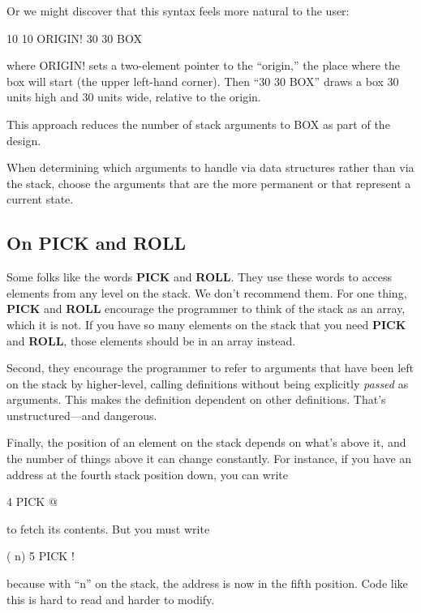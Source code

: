 Or we might discover that this syntax feels more natural to the
user:

\begin{Code}
10 10 ORIGIN! 30 30 BOX
\end{Code}
where ORIGIN! sets a two-element pointer to the ``origin,'' the place
where the box will start (the upper left-hand corner). Then ``30 30 BOX''
draws a box 30 units high and 30 units wide, relative to the origin.

This approach reduces the number of stack arguments to BOX as
part of the design.

\begin{tip}
When determining which arguments to handle via data structures rather
than via the stack, choose the arguments that are the more permanent or
that represent a current state.
\end{tip}
\subsection{On PICK and ROLL}

Some folks like the words \textbf{PICK} and \textbf{ROLL}. They use these words to
access elements from any level on the stack. We don't recommend them.
For one thing, \textbf{PICK} and \textbf{ROLL} encourage the programmer to think
of the stack as an array, which it is not. If you have so many elements on
the stack that you need \textbf{PICK} and \textbf{ROLL}, those elements should be in
an array instead.

Second, they encourage the programmer to refer to arguments that
have been left on the stack by higher-level, calling definitions without
being explicitly \emph{passed} as arguments. This makes the definition
dependent on other definitions. That's unstructured---and dangerous.

Finally, the position of an element on the stack depends on what's
above it, and the number of things above it can change constantly. For
instance, if you have an address at the fourth stack position down, you can
write

\begin{Code}
4 PICK @
\end{Code}
to fetch its contents. But you must write

\begin{Code}
( n) 5 PICK !
\end{Code}
because with ``n'' on the stack, the address is now in the fifth position.
Code like this is hard to read and harder to modify.

